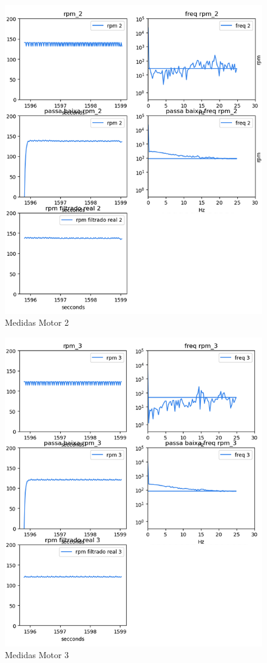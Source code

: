 \begin{figure}[ht]
	\centering
	\includegraphics{figures/medidas_motor_2}
	\caption{Medidas Motor 2}
	\label{fig:medidas_motor_2}
\end{figure}


\begin{figure}[ht]
	\centering
	\includegraphics{figures/medidas_motor_3}
	\caption{Medidas Motor 3}
	\label{fig:medidas_motor_3}
\end{figure}



